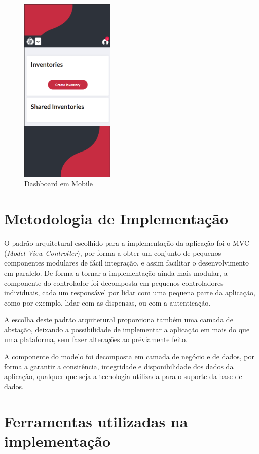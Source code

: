 \documentclass[a4paper]{report}
\begin{document}
    \begin{figure}[H]
    \centering
            \includegraphics[width=0.4\textwidth]{images/mockup/dashboard_mobile.png}
            \caption{Dashboard em Mobile}
    \end{figure}
    

\chapter{Metodologia de Implementação}
O padrão arquitetural escolhido para a implementação da aplicação foi o MVC
(\textit{Model View Controller}), por forma a obter um conjunto de pequenos
componentes modulares de fácil integração, e assim facilitar o desenvolvimento 
em paralelo. De forma a tornar a implementação ainda mais modular, a componente
do controlador foi decomposta em pequenos controladores individuais, cada um
responsável por lidar com uma pequena parte da aplicação, como por exemplo,
lidar com as dispensas, ou com a autenticação.

A escolha deste padrão arquitetural proporciona também uma camada de abstação,
deixando a possibilidade de implementar a aplicação em mais do que uma
plataforma, sem fazer alterações ao préviamente feito.

A componente do modelo foi decomposta em camada de negócio e de dados, por forma
a garantir a consitência, integridade e disponibilidade dos dados da aplicação,
qualquer que seja a tecnologia utilizada para o suporte da base de dados.

\chapter{Ferramentas utilizadas na implementação}
\end{document}
